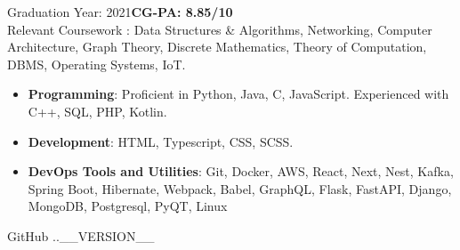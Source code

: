 \documentclass[10pt,a4paper,ragged2e]{classes/altacv}
\begin{document}


Graduation Year: 2021\hspace{5mm}\textbf{CG-PA: 8.85/10 }\\
\smallskip
Relevant Coursework : Data Structures \& Algorithms, Networking, Computer Architecture, Graph Theory, Discrete Mathematics, Theory of Computation, DBMS, Operating Systems, IoT.



\smallskip
\begin{itemize}
\item \textbf{Programming}: Proficient in Python, Java, C, JavaScript. Experienced with C++, SQL, PHP, Kotlin.
\smallskip
\item \textbf{Development}: HTML, Typescript, CSS, SCSS.
\smallskip
\item \textbf{DevOps Tools and Utilities}: Git, Docker, AWS, React, Next, Nest, Kafka, Spring Boot, Hibernate, Webpack, Babel, GraphQL, Flask, FastAPI, Django, MongoDB, Postgresql, PyQT, Linux  
\smallskip
\end{itemize}

\smallskip
\begin{footnotesize}
GitHub \number \month .\number\year.__VERSION__
\end{footnotesize}
\clearpage
\end{document}
